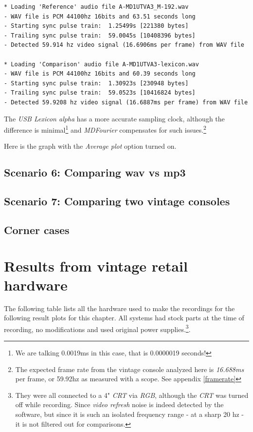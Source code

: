 \documentclass[10pt,a4paper]{report}
\begin{document}
\begin{verbatim}
* Loading 'Reference' audio file A-MD1UTVA3_M-192.wav
- WAV file is PCM 44100hz 16bits and 63.51 seconds long
- Starting sync pulse train:  1.25499s [221380 bytes]
- Trailing sync pulse train:  59.0045s [10408396 bytes]
- Detected 59.914 hz video signal (16.6906ms per frame) from WAV file

* Loading 'Comparison' audio file A-MD1UTVA3-lexicon.wav
- WAV file is PCM 44100hz 16bits and 60.39 seconds long
- Starting sync pulse train:  1.30923s [230948 bytes]
- Trailing sync pulse train:  59.0523s [10416824 bytes]
- Detected 59.9208 hz video signal (16.6887ms per frame) from WAV file
\end{verbatim}

The \textit{USB Lexicon alpha} has a more accurate sampling clock, although the difference is minimal\footnote{We are talking 0.0019ms in this case, that is 0.0000019 seconds!} and \textit{MDFourier} compensates for such issues.\footnote{The expected frame rate from the vintage console analyzed here is \textit{16.688ms} per frame, or 59.92hz as measured with a scope. See appendix \ref{framerate}}

Here is the graph with the \textit{Average plot} option turned on.

\section{Scenario 6: Comparing wav vs mp3}
\label{mp3}

\section{Scenario 7: Comparing two vintage consoles}

\section{Corner cases}
\label{cornercase}

\chapter{Results from vintage retail hardware}

The following table lists all the hardware used to make the recordings for the following result plots for this chapter. All systems had stock parts at the time of recording, no modifications and used original power supplies.\footnote{They were all connected to a 4" \textit{CRT} via \textit{RGB}, although the \textit{CRT} was turned off while recording. Since \textit{video refresh} noise is indeed detected by the software, but since it is such an isolated frequency range - at a sharp 20 hz - it is not filtered out for comparisons.}. 
\end{document}
